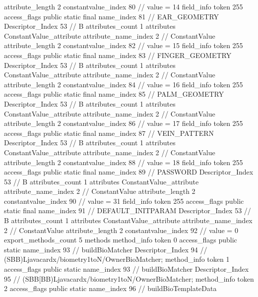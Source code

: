 {{{{{{{					attribute_length	2
					constantvalue_index	80		// value = 14
				}
				}
			}
			field_info {
				token	255
				access_flags	public static final
				name_index	81		// EAR_GEOMETRY
				Descriptor_Index	53		// B
				attributes_count	1
				attributes {
				ConstantValue_attribute {
					attribute_name_index	2		// ConstantValue
					attribute_length	2
					constantvalue_index	82		// value = 15
				}
				}
			}
			field_info {
				token	255
				access_flags	public static final
				name_index	83		// FINGER_GEOMETRY
				Descriptor_Index	53		// B
				attributes_count	1
				attributes {
				ConstantValue_attribute {
					attribute_name_index	2		// ConstantValue
					attribute_length	2
					constantvalue_index	84		// value = 16
				}
				}
			}
			field_info {
				token	255
				access_flags	public static final
				name_index	85		// PALM_GEOMETRY
				Descriptor_Index	53		// B
				attributes_count	1
				attributes {
				ConstantValue_attribute {
					attribute_name_index	2		// ConstantValue
					attribute_length	2
					constantvalue_index	86		// value = 17
				}
				}
			}
			field_info {
				token	255
				access_flags	public static final
				name_index	87		// VEIN_PATTERN
				Descriptor_Index	53		// B
				attributes_count	1
				attributes {
				ConstantValue_attribute {
					attribute_name_index	2		// ConstantValue
					attribute_length	2
					constantvalue_index	88		// value = 18
				}
				}
			}
			field_info {
				token	255
				access_flags	public static final
				name_index	89		// PASSWORD
				Descriptor_Index	53		// B
				attributes_count	1
				attributes {
				ConstantValue_attribute {
					attribute_name_index	2		// ConstantValue
					attribute_length	2
					constantvalue_index	90		// value = 31
				}
				}
			}
			field_info {
				token	255
				access_flags	public static final
				name_index	91		// DEFAULT_INITPARAM
				Descriptor_Index	53		// B
				attributes_count	1
				attributes {
				ConstantValue_attribute {
					attribute_name_index	2		// ConstantValue
					attribute_length	2
					constantvalue_index	92		// value = 0
				}
				}
			}
			}
			export_methods_count	5
			methods {
				method_info {
					token	0
					access_flags	public static
					name_index	93		// buildBioMatcher
					Descriptor_Index	94		// (SBB)Ljavacardx/biometry1toN/OwnerBioMatcher;
				}
				method_info {
					token	1
					access_flags	public static
					name_index	93		// buildBioMatcher
					Descriptor_Index	95		// (SBB[BB)Ljavacardx/biometry1toN/OwnerBioMatcher;
				}
				method_info {
					token	2
					access_flags	public static
					name_index	96		// buildBioTemplateData
}}}}}
